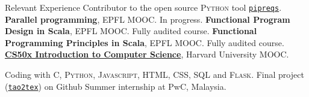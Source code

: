 \begin{rubric}{Relevant Experience}
\entry*[2023] Contributor to the open source \textsc{Python} tool \href{https://github.com/bndr/pipreqs}{\texttt{pipreqs}}.
\entry*[2023] \textbf{Parallel programming}, EPFL MOOC. In progress.
\entry*[2023] \textbf{Functional Program Design in Scala}, EPFL MOOC. Fully audited course.
\entry*[2022] \textbf{Functional Programming Principles in Scala}, EPFL MOOC. Fully audited course.
\entry*[2022] \href{https://certificates.cs50.io/61d7b5aa-582d-49e7-ada4-c7cd0b965c9b.pdf?size=letter}{\textbf{CS50x Introduction to Computer Science}}, Harvard University MOOC. \par Coding with \textsc{C, Python, Javascript, HTML, CSS, SQL} and \textsc{Flask}. Final project (\href{https://github.com/clvnkhr/tao2tex}{\texttt{tao2tex}}) on Github
\entry*[2015] Summer internship at PwC, Malaysia.
%


\end{rubric}